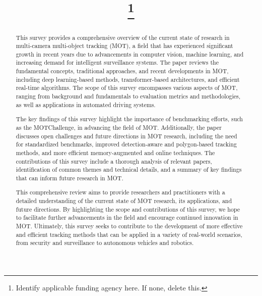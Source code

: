 \documentclass[conference]{IEEEtran}
\begin{document}
\title{
\thanks{Identify applicable funding agency here. If none, delete this.}
}

\author{
\and
{}
}

\maketitle

\begin{abstract}
This survey provides a comprehensive overview of the current state of research in multi-camera multi-object tracking (MOT), a field that has experienced significant growth in recent years due to advancements in computer vision, machine learning, and increasing demand for intelligent surveillance systems. The paper reviews the fundamental concepts, traditional approaches, and recent developments in MOT, including deep learning-based methods, transformer-based architectures, and efficient real-time algorithms. The scope of this survey encompasses various aspects of MOT, ranging from background and fundamentals to evaluation metrics and methodologies, as well as applications in automated driving systems.

The key findings of this survey highlight the importance of benchmarking efforts, such as the MOTChallenge, in advancing the field of MOT. Additionally, the paper discusses open challenges and future directions in MOT research, including the need for standardized benchmarks, improved detection-aware and polygon-based tracking methods, and more efficient memory-augmented and online techniques. The contributions of this survey include a thorough analysis of relevant papers, identification of common themes and technical details, and a summary of key findings that can inform future research in MOT.

This comprehensive review aims to provide researchers and practitioners with a detailed understanding of the current state of MOT research, its applications, and future directions. By highlighting the scope and contributions of this survey, we hope to facilitate further advancements in the field and encourage continued innovation in MOT. Ultimately, this survey seeks to contribute to the development of more effective and efficient tracking methods that can be applied in a variety of real-world scenarios, from security and surveillance to autonomous vehicles and robotics.
\end{abstract}
\end{document}
